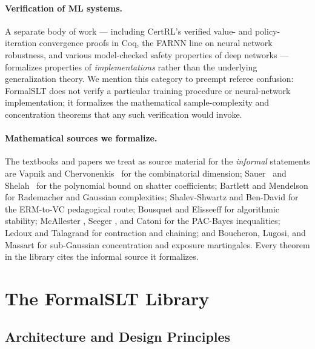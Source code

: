 \documentclass[sigplan,anonymous,review,screen]{acmart}
\begin{document}
\paragraph{Verification of ML systems.}
A separate body of work --- including CertRL's verified value- and
policy-iteration convergence proofs in Coq, the FARNN line on neural
network robustness, and various model-checked safety properties of
deep networks --- formalizes properties of \emph{implementations} rather
than the underlying generalization theory. We mention this category to
preempt referee confusion: FormalSLT does not verify a particular
training procedure or neural-network implementation; it formalizes the
mathematical sample-complexity and concentration theorems that any such
verification would invoke.

\paragraph{Mathematical sources we formalize.}
The textbooks and papers we treat as source material for the
\emph{informal} statements are
Vapnik and Chervonenkis~\cite{VapnikChervonenkis1971} for the
combinatorial dimension; Sauer~\cite{Sauer1972} and
Shelah~\cite{Shelah1972} for the polynomial bound on shatter
coefficients; Bartlett and Mendelson \cite{BartlettMendelson2002} for
Rademacher and Gaussian complexities;
Shalev-Shwartz and Ben-David \cite{ShalevShwartz2014} for the
ERM-to-VC pedagogical route;
Bousquet and Elisseeff \cite{BousquetElisseeff2002} for algorithmic
stability; McAllester \cite{McAllester1999}, Seeger
\cite{Seeger2002}, and Catoni \cite{Catoni2007} for the PAC-Bayes
inequalities; Ledoux and Talagrand \cite{LedouxTalagrand1991} for
contraction and chaining; and Boucheron, Lugosi, and Massart
\cite{BoucheronLugosiMassart2013} for sub-Gaussian concentration and
exposure martingales. Every theorem in the library cites the informal
source it formalizes.

\section{The FormalSLT Library}
\label{sec:library}

\subsection{Architecture and Design Principles}
\end{document}
